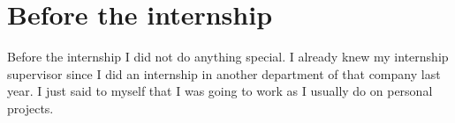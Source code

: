 \section{Before the internship}
Before the internship I did not do anything special. I already knew my internship supervisor since I did
an internship in another department of that company last year. I just said to myself that I was going to
work as I usually do on personal projects.